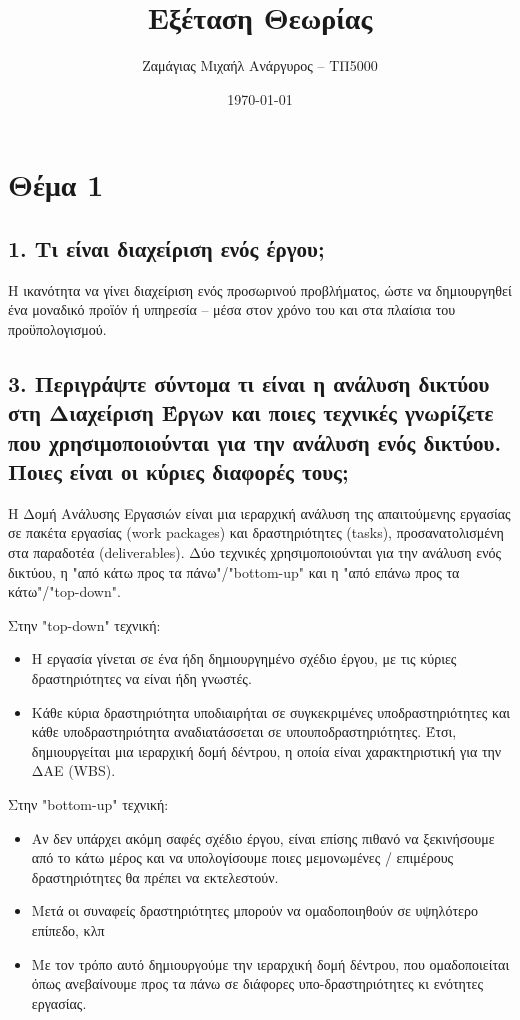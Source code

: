 \documentclass[12pt]{turabian-researchpaper}
\title{Εξέταση Θεωρίας}
\author{Ζαμάγιας Μιχαήλ Ανάργυρος -- ΤΠ5000}
\date{\today}
\begin{document}
\begin{titlepage}
    \maketitle
\end{titlepage}

\tableofcontents

\newpage

\section{Θέμα 1}

\subsection{1. Τι είναι διαχείριση ενός έργου;}

Η ικανότητα να γίνει διαχείριση ενός προσωρινού προβλήματος, ώστε να δημιουργηθεί ένα μοναδικό προϊόν ή υπηρεσία – μέσα στον χρόνο του και στα πλαίσια του προϋπολογισμού.

\subsection{3. Περιγράψτε σύντομα τι είναι η ανάλυση δικτύου στη Διαχείριση Έργων και ποιες τεχνικές γνωρίζετε που χρησιμοποιούνται για την ανάλυση ενός δικτύου. Ποιες είναι οι κύριες διαφορές τους;}

Η Δομή Ανάλυσης Εργασιών είναι μια ιεραρχική ανάλυση της απαιτούμενης εργασίας σε πακέτα εργασίας (work packages) και δραστηριότητες (tasks), προσανατολισμένη στα παραδοτέα (deliverables). Δύο τεχνικές χρησιμοποιούνται για την ανάλυση ενός δικτύου, η "από κάτω προς τα πάνω"/"bottom-up" και η "από επάνω προς τα κάτω"/"top-down".

Στην "top-down" τεχνική:
\begin{itemize}
    \item Η εργασία γίνεται σε ένα ήδη δημιουργημένο σχέδιο έργου, με τις κύριες δραστηριότητες να είναι ήδη γνωστές.
    \item Κάθε κύρια δραστηριότητα υποδιαιρήται σε συγκεκριμένες υποδραστηριότητες και κάθε υποδραστηριότητα αναδιατάσσεται σε υπουποδραστηριότητες. Έτσι, δημιουργείται μια ιεραρχική δομή δέντρου, η οποία είναι χαρακτηριστική για την ΔΑΕ (WBS).
\end{itemize}

Στην "bottom-up" τεχνική:
\begin{itemize}
    \item Αν δεν υπάρχει ακόμη σαφές σχέδιο έργου, είναι επίσης πιθανό να ξεκινήσουμε από το κάτω μέρος και να υπολογίσουμε ποιες μεμονωμένες / επιμέρους δραστηριότητες θα πρέπει να εκτελεστούν.
    \item Μετά οι συναφείς δραστηριότητες μπορούν να ομαδοποιηθούν σε υψηλότερο επίπεδο, κλπ
    \item Με τον τρόπο αυτό δημιουργούμε την ιεραρχική δομή δέντρου, που ομαδοποιείται όπως ανεβαίνουμε προς τα πάνω σε διάφορες υπο-δραστηριότητες κι ενότητες εργασίας.
\end{itemize}
\end{document}
